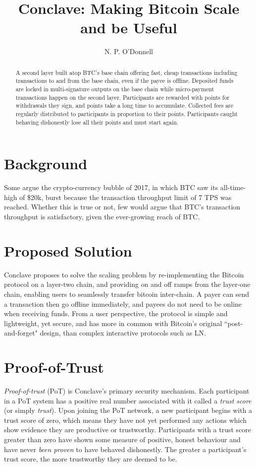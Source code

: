 \documentclass{article}
\title{Conclave: Making Bitcoin Scale and be Useful}
\author{N. P. O'Donnell}
\begin{document}
\maketitle
\begin{abstract}
A second layer built atop BTC's base chain offering fast, cheap transactions including transactions to and from the 
base chain, even if the payee is offline. Deposited funds are locked in multi-signature outputs on the base chain while
micro-payment transactions happen on the second layer. Participants are rewarded with points for withdrawals they sign, 
and points take a long time to accumulate. Collected fees are regularly distributed to participants in proportion to 
their points. Participants caught behaving dishonestly lose all their points and must start again.
\end{abstract}

\section{Background}

Some argue the crypto-currency bubble of 2017, in which BTC saw its all-time-high of \$20k, burst because the transaction throughput limit of 7 TPS was reached. Whether this is true or not, few would argue that BTC's transaction throughput is satisfactory, given the ever-growing reach of BTC.

\section{Proposed Solution}

Conclave proposes to solve the scaling problem by re-implementing the Bitcoin protocol on a layer-two chain, and providing on and off ramps from the layer-one chain, enabling users to seamlessly transfer bitcoin inter-chain. A payer can send a transaction then go offline immediately, and payees do not need to be online when receiving funds. From a user perspective, the protocol is simple and lightweight, yet secure, and has more in common with Bitcoin's original ``post-and-forget" design, than complex interactive protocols such as LN. \\

\section{Proof-of-Trust}

\textit{Proof-of-trust} (PoT) is Conclave's primary security mechanism. Each participant in a PoT system has a positive real number associated with it called a \textit{trust score} (or simply \textit{trust}). Upon joining the PoT network, a new participant begins with a trust score of zero, which means they have not yet performed any actions which show evidence they are productive or trustworthy. Participants with a trust score greater than zero have shown some measure of positive, honest behaviour and have never \textit{been proven} to have behaved dishonestly. The greater a participant's trust score, the more trustworthy they are deemed to be.
\end{document}
